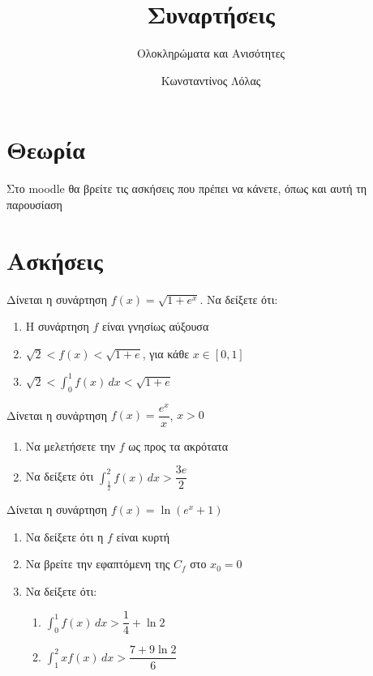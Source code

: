 \documentclass{../presentation}
\title{Συναρτήσεις}
\subtitle{Ολοκληρώματα και Ανισότητες}
\author[Λόλας]{Κωνσταντίνος Λόλας}
\institute[$10^ο$ ΓΕΛ]{$10^ο$ ΓΕΛ Θεσσαλονίκης}
\date{}
\begin{document}
\begin{frame}
  \titlepage
\end{frame}

\section{Θεωρία}

\begin{frame}[noframenumbering]
  Στο moodle θα βρείτε τις ασκήσεις που πρέπει να κάνετε, όπως και αυτή τη παρουσίαση
\end{frame}

\section{Ασκήσεις}

\exercises

\begin{askisi}
  Δίνεται η συνάρτηση $f(x)=\sqrt{1+e^x}$. Να δείξετε ότι:
  \begin{enumerate}[<+->]
    \item Η συνάρτηση $f$ είναι γνησίως αύξουσα
    \item $\sqrt{2}<f(x)<\sqrt{1+e}$, για κάθε $x\in [0,1]$
    \item $\sqrt{2}<\int_{0}^{1} f(x)\, dx<\sqrt{1+e}$
  \end{enumerate}
\end{askisi}

\begin{askisi}
  Δίνεται η συνάρτηση $f(x)=\dfrac{e^x}{x}$, $x>0$
  \begin{enumerate}[<+->]
    \item Να μελετήσετε την $f$ ως προς τα ακρότατα
    \item Να δείξετε ότι $\int_{\frac{1}{2}}^{2}f(x)\, dx>\dfrac{3e}{2}$
  \end{enumerate}
\end{askisi}

\begin{askisi}
  Δίνεται η συνάρτηση $f(x)=\ln (e^x+1)$
  \begin{enumerate}[<+->]
    \item Να δείξετε ότι η $f$ είναι κυρτή
    \item Να βρείτε την εφαπτόμενη της $C_f$ στο $x_0=0$
    \item Να δείξετε ότι:
          \begin{enumerate}[<+->]
            \item $\int_{0}^{1}f(x)\, dx>\dfrac{1}{4}+\ln 2$
            \item $\int_{1}^{2}xf(x)\, dx>\dfrac{7+9\ln 2}{6}$
          \end{enumerate}
  \end{enumerate}
\end{askisi}
\end{document}
